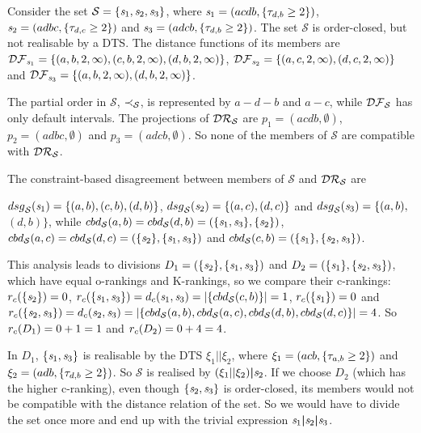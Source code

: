 \begin{example}
\label{ex-with-time-3}
Consider the set $\mathcal{S}=\{\mathit{s}_1,\mathit{s}_2,\mathit{s}_3\}$, where
$\mathit{s}_1=(acdb,\{\tau_{d,b} \geq 2\})$,
$\mathit{s}_2=(adbc,\{\tau_{d,c} \geq 2\})$ and
$\mathit{s}_3=(adcb,\{\tau_{d,b} \geq 2\})$.
The set $\mathcal{S}$ is order-closed, but not realisable by a DTS.
The distance functions of its members are
$\mathcal{DF}_{\mathit{s}_1}=
 \{
  (a, b, 2, \infty),
(c, b, 2, \infty),
(d, b, 2, \infty)
\}$,
$\mathcal{DF}_{\mathit{s}_2}=
 \{
 (a, c, 2, \infty),
 (d,c,  2, \infty)
 \}$ and
$\mathcal{DF}_{\mathit{s}_3}=
 \{
  (a, b, 2, \infty),
  (d, b, 2, \infty)
 \}$.

The partial order in $\mathcal{S}$, $\prec_{\mathcal{S}}$, is represented by
$a-d-b$ and $a-c$, while $\mathcal{DF}_{\mathcal{S}}$ has only default intervals.
The projections of $\mathcal{DR}_{\mathcal{S}}$ are
$p_1=(acdb,\emptyset)$,
$p_2=(adbc,\emptyset)$ and
$p_3=(adcb,\emptyset)$.
So none of the members of $\mathcal{S}$ are compatible with
$\mathcal{DR}_{\mathcal{S}}$.

The constraint-based disagreement between members of $\mathcal{S}$ and
$\mathcal{DR}_{\mathcal{S}}$ are

\noindent
${dsg}_{\mathcal{S}}(\mathit{s}_1)=\{(a,b),(c,b),(d,b)\}$,
${dsg}_{\mathcal{S}}(\mathit{s}_2)=\{(a,c),(d,c)\}$ and
${dsg}_{\mathcal{S}}(\mathit{s}_3)=\{(a,b),$\\$(d,b)\}$,
while
${cbd}_{\mathcal{S}}(a,b)={cbd}_{\mathcal{S}}(d,b)=(\{\mathit{s}_1,\mathit{s}_3\},\{\mathit{s}_2\})$,
${cbd}_{\mathcal{S}}(a,c)={cbd}_{\mathcal{S}}(d,c)=(\{\mathit{s}_2\},\{\mathit{s}_1,\mathit{s}_3\})$ and
${cbd}_{\mathcal{S}}(c,b)=(\{\mathit{s}_1\},\{\mathit{s}_2,\mathit{s}_3\})$.

\noindent
This analysis leads to divisions $D_1=(\{\mathit{s}_2\},\{\mathit{s}_1,\mathit{s}_3\})$
and $D_2=(\{\mathit{s}_1\},\{\mathit{s}_2,\mathit{s}_3\})$, which have
equal o-rankings and K-rankings,
so we compare their c-rankings:
\noindent
$r_c(\{\mathit{s}_2\})= 0$,
$r_c(\{\mathit{s}_1,\mathit{s}_3\})={{d}_c}(\mathit{s}_1,\mathit{s}_3)=|\{{cbd}_{\mathcal{S}}(c,b)\}|=1$,
$r_c(\{\mathit{s}_1\})= 0$
and
$r_c(\{\mathit{s}_2,\mathit{s}_3\})={{d}_c}(\mathit{s}_2,\mathit{s}_3)=
|\{{cbd}_{\mathcal{S}}(a,b),{cbd}_{\mathcal{S}}(a,c),{cbd}_{\mathcal{S}}(d,b),{cbd}_{\mathcal{S}}(d,c)\}|=4$.
So $r_c(D_1)=0+1=1$ and $r_c(D_2)=0+4=4$.

In $D_1$, $\{\mathit{s}_1,\mathit{s}_3\}$ is realisable by the DTS
$\xi_1||\xi_2$, where $\xi_1=(acb,\{\tau_{a,b}\geq 2\})$ and
$\xi_2=(adb,\{\tau_{d,b}\geq 2\})$.
So ${\mathcal{S}}$ is realised by $(\xi_1||\xi_2)\boldsymbol{|}\mathit{s}_2$.
If we choose $D_2$ (which has the higher c-ranking), even though
$\{\mathit{s}_2,\mathit{s}_3\}$ is order-closed, its members would not be
compatible with the distance relation of the set. So we would have to
divide the set once more and end up with the trivial expression
$\mathit{s}_1\boldsymbol{|}\mathit{s}_2\boldsymbol{|}\mathit{s}_3$.
\end{example}
